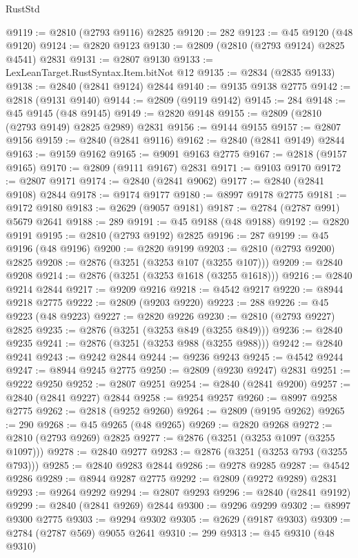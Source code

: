 \begin{lexlean}{RustStd}
\begin{coremodule}
@9119 := @2810 (@2793 @9116) @2825
@9120 := 282
@9123 := @45 @9120 (@48 @9120)
@9124 := @2820 @9123
@9130 := @2809 (@2810 (@2793 @9124) @2825 @4541) @2831
@9131 := @2807 @9130
@9133 := LexLeanTarget.RustSyntax.Item.bitNot @12
@9135 := @2834 (@2835 @9133)
@9138 := @2840 (@2841 @9124) @2844
@9140 := @9135 @9138 @2775
@9142 := @2818 (@9131 @9140)
@9144 := @2809 (@9119 @9142)
@9145 := 284
@9148 := @45 @9145 (@48 @9145)
@9149 := @2820 @9148
@9155 := @2809 (@2810 (@2793 @9149) @2825 @2989) @2831
@9156 := @9144 @9155
@9157 := @2807 @9156
@9159 := @2840 (@2841 @9116)
@9162 := @2840 (@2841 @9149) @2844
@9163 := @9159 @9162
@9165 := @9091 @9163 @2775
@9167 := @2818 (@9157 @9165)
@9170 := @2809 (@9111 @9167) @2831
@9171 := @9103 @9170
@9172 := @2807 @9171
@9174 := @2840 (@2841 @9062)
@9177 := @2840 (@2841 @9108) @2844
@9178 := @9174 @9177
@9180 := @8997 @9178 @2775
@9181 := @9172 @9180
@9183 := @2629 (@9057 @9181)
@9187 := @2784 (@2787 @991) @5679 @2641
@9188 := 289
@9191 := @45 @9188 (@48 @9188)
@9192 := @2820 @9191
@9195 := @2810 (@2793 @9192) @2825
@9196 := 287
@9199 := @45 @9196 (@48 @9196)
@9200 := @2820 @9199
@9203 := @2810 (@2793 @9200) @2825
@9208 := @2876 (@3251 (@3253 @107 (@3255 @107)))
@9209 := @2840 @9208
@9214 := @2876 (@3251 (@3253 @1618 (@3255 @1618)))
@9216 := @2840 @9214 @2844
@9217 := @9209 @9216
@9218 := @4542 @9217
@9220 := @8944 @9218 @2775
@9222 := @2809 (@9203 @9220)
@9223 := 288
@9226 := @45 @9223 (@48 @9223)
@9227 := @2820 @9226
@9230 := @2810 (@2793 @9227) @2825
@9235 := @2876 (@3251 (@3253 @849 (@3255 @849)))
@9236 := @2840 @9235
@9241 := @2876 (@3251 (@3253 @988 (@3255 @988)))
@9242 := @2840 @9241
@9243 := @9242 @2844
@9244 := @9236 @9243
@9245 := @4542 @9244
@9247 := @8944 @9245 @2775
@9250 := @2809 (@9230 @9247) @2831
@9251 := @9222 @9250
@9252 := @2807 @9251
@9254 := @2840 (@2841 @9200)
@9257 := @2840 (@2841 @9227) @2844
@9258 := @9254 @9257
@9260 := @8997 @9258 @2775
@9262 := @2818 (@9252 @9260)
@9264 := @2809 (@9195 @9262)
@9265 := 290
@9268 := @45 @9265 (@48 @9265)
@9269 := @2820 @9268
@9272 := @2810 (@2793 @9269) @2825
@9277 := @2876 (@3251 (@3253 @1097 (@3255 @1097)))
@9278 := @2840 @9277
@9283 := @2876 (@3251 (@3253 @793 (@3255 @793)))
@9285 := @2840 @9283 @2844
@9286 := @9278 @9285
@9287 := @4542 @9286
@9289 := @8944 @9287 @2775
@9292 := @2809 (@9272 @9289) @2831
@9293 := @9264 @9292
@9294 := @2807 @9293
@9296 := @2840 (@2841 @9192)
@9299 := @2840 (@2841 @9269) @2844
@9300 := @9296 @9299
@9302 := @8997 @9300 @2775
@9303 := @9294 @9302
@9305 := @2629 (@9187 @9303)
@9309 := @2784 (@2787 @569) @9055 @2641
@9310 := 299
@9313 := @45 @9310 (@48 @9310)

\end{coremodule}
\end{lexlean}
